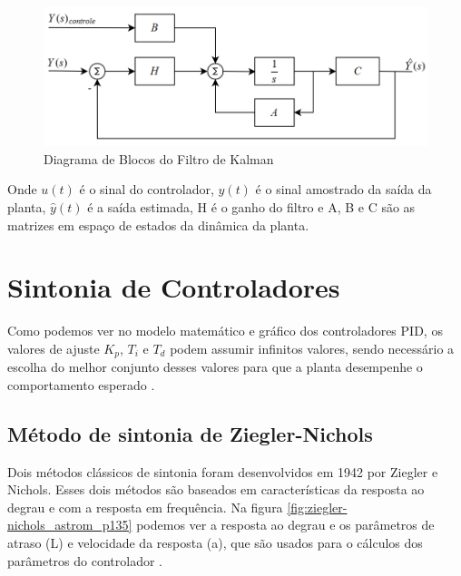 \begin{figure}[H]
  \caption{Diagrama de Blocos do Filtro de Kalman}
  \begin{center}
      \includegraphics[scale=0.5]{referencial/img/kalman_levine_p591}
  \end{center}
  \label{fig:kalman_levine_p591}
\end{figure}

Onde $u(t)$ é o sinal do controlador, $y(t)$ é o sinal amostrado da saída da planta, $\hat {y}(t) $ é a saída estimada, H é o ganho do filtro e A, B e C são as matrizes em espaço de estados da dinâmica da planta.



\section{Sintonia de Controladores}

Como podemos ver no modelo matemático e gráfico dos controladores PID, os valores de ajuste $K_p$, $T_i$ e $T_d$  podem assumir infinitos valores, sendo necessário a escolha do melhor conjunto desses valores para que a planta desempenhe o comportamento esperado \cite{Ogata}.



\subsection{Método de sintonia de Ziegler-Nichols}

Dois métodos clássicos de sintonia foram desenvolvidos em 1942 por Ziegler e Nichols. Esses dois métodos são baseados em características da resposta ao degrau e com a resposta em frequência. Na figura \ref{fig:ziegler-nichols_astrom_p135} podemos ver a resposta ao degrau e os parâmetros de atraso (L) e velocidade da resposta (a), que são usados para o cálculos dos parâmetros do controlador  \cite{Astrom1995}. 

